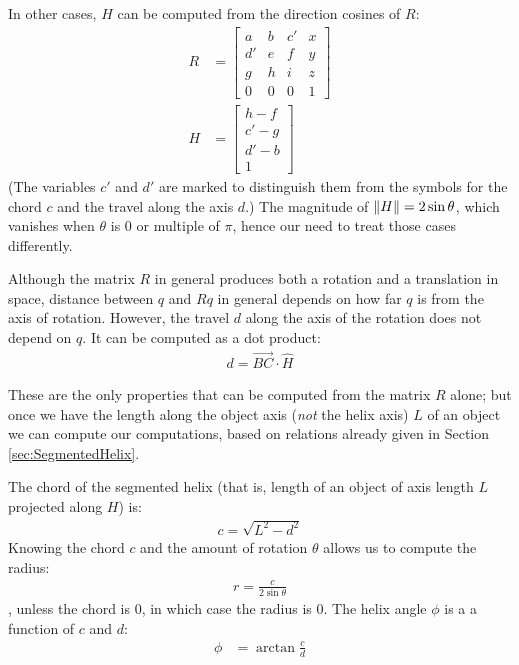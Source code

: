 \documentclass[11pt]{article}
\DeclarePairedDelimiter{\norm}{\lVert}{\rVert}
\begin{document}
{In other cases, $H$ can be computed from the direction
cosines of $R$\cite{wiki:rotation}:
\begin{align}
  R &=     \begin{bmatrix} a & b & c' & x \\ d' & e & f & y\\ g & h & i & z\\ 0 &  0 & 0 & 1\end{bmatrix} \\
    H &=  \begin{bmatrix} h - f \\ c' - g \\ d' - b \\ 1 \end{bmatrix}
\end{align}
(The variables $c'$ and $d'$ are marked to distinguish them from
the symbols for the chord $c$ and the travel along the axis $d$.)
The magnitude of $\norm{H} = 2 \sin{\theta}$, which vanishes
when $\theta$ is $0$ or multiple of $\pi$, hence our need
to treat those cases differently.

Although the matrix $R$ in general produces both a rotation
and a translation in space, distance between $q$ and $Rq$
in general depends on how far $q$ is from the axis of rotation.
However, the travel $d$ along the axis of the rotation does
not depend on $q$. It can be computed as a dot product:
\begin{align}
  d = \overrightarrow{BC} \cdot \hat{H}
\end{align}

These are the only properties that can be computed from the
matrix $R$ alone; but once we have the length along the
object axis ({\em not} the helix axis) $L$ of an object
we can compute our computations, based on relations
already given in Section \ref{sec:SegmentedHelix}.

The chord of the segmented helix (that is, length of an object of
axis length $L$
projected along $H$) is:
\begin{align}
  c = \sqrt{L^2 - d^2}
\end{align}
Knowing the chord $c$ and the amount of rotation $\theta$
allows us to compute the radius:
\begin{align}
  r = \frac{c}{2 \sin{\theta}}
\end{align},
unless the chord is $0$, in which case the radius is $0$.
The helix angle $\phi$ is a a function of $c$ and $d$:
\begin{align}
    \phi &= \arctan{\frac{c}{d}}
\end{align}

}
\end{document}
